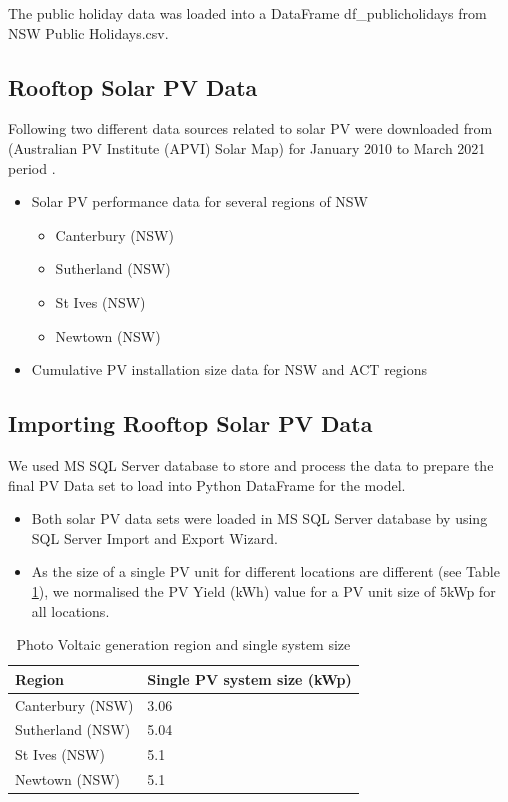\documentclass[mstat,12pt]{unswthesis}
\begin{document}
The public holiday data was loaded into a DataFrame df\_publicholidays
from NSW Public Holidays.csv.

\hypertarget{rooftop-solar-pv-data}{%
\subsection{Rooftop Solar PV Data}\label{rooftop-solar-pv-data}}

Following two different data sources related to solar PV were downloaded
from (Australian PV Institute (APVI) Solar Map) for January 2010 to
March 2021 period \cite{_2021_australian}.

\begin{itemize}
\item Solar PV performance data for several regions of NSW
\begin {itemize}
\item Canterbury (NSW)
\item Sutherland (NSW)
\item St Ives (NSW)
\item Newtown (NSW)
\end{itemize}
\item Cumulative PV installation size data for NSW and ACT regions 
\end{itemize}

\hypertarget{importing-rooftop-solar-pv-data}{%
\subsection{Importing Rooftop Solar PV
Data}\label{importing-rooftop-solar-pv-data}}

We used MS SQL Server database to store and process the data to prepare
the final PV Data set to load into Python DataFrame for the model.

\begin{itemize}
\item Both solar PV data sets were loaded in MS SQL Server database by using SQL Server Import and Export Wizard.
\item As the size of a single PV unit for different locations are different (see Table \ref{tab:pv_size}), we normalised the PV Yield (kWh) value for a PV unit size of 5kWp for all locations.
\end{itemize}

\begin{table}[H]
\centering
\begin{tabular}{ll} 
\hline\hline
\textbf{Region}  & \textbf{Single PV system size (kWp)}  \\ 
\hline\hline
Canterbury (NSW) & 3.06                                  \\
Sutherland (NSW) & 5.04                                  \\
St Ives (NSW)    & 5.1                                   \\
Newtown (NSW)    & 5.1                                   \\
\hline\hline
\end{tabular}
\caption{Photo Voltaic generation region and single system size}
\label{tab:pv_size}
\end{table}
\end{document}
